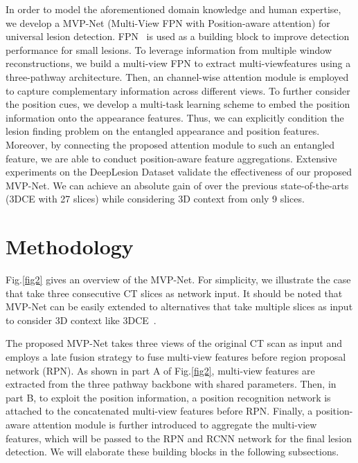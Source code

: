 \documentclass[runningheads]{llncs}
\begin{document}
In order to model the aforementioned domain knowledge and human expertise, we develop a MVP-Net (Multi-View FPN with Position-aware attention) for universal lesion detection. FPN~\cite{FPN} is used as a building block to improve detection performance for small lesions. To leverage information from multiple window reconstructions, we build a multi-view FPN to extract multi-view\footnotemark[3] features using a three-pathway architecture. Then, an channel-wise attention module is employed to capture complementary information across different views. To further consider the position cues, we develop a multi-task learning scheme to embed the position information onto the appearance features. Thus, we can explicitly condition the lesion finding problem on the entangled appearance and position features. Moreover, by connecting the proposed attention module to such an entangled feature, we are able to conduct position-aware feature aggregations. Extensive experiments on the DeepLesion Dataset validate the effectiveness of our proposed MVP-Net. We can achieve an absolute gain of  over the previous state-of-the-arts (3DCE with 27 slices) while considering 3D context from only 9 slices.


\section{Methodology}

 
Fig.\ref{fig2} gives an overview of the MVP-Net. For simplicity, we illustrate the case that take three consecutive CT slices as network input. It should be noted that MVP-Net can be easily extended to alternatives that take multiple slices as input to consider 3D context like 3DCE~\cite{3DCE}. 

The proposed MVP-Net takes three views of the original CT scan as input and employs a late fusion strategy to fuse multi-view features before region proposal network (RPN). As shown in part A of Fig.\ref{fig2}, multi-view features are extracted from the three pathway backbone with shared parameters. Then, in part B, to exploit the position information, a position recognition network is attached to the concatenated multi-view features before RPN. Finally, a position-aware attention module is further introduced to aggregate the multi-view features, which will be passed to the RPN and RCNN network for the final lesion detection. We will elaborate these building blocks in the following subsections.
\end{document}

